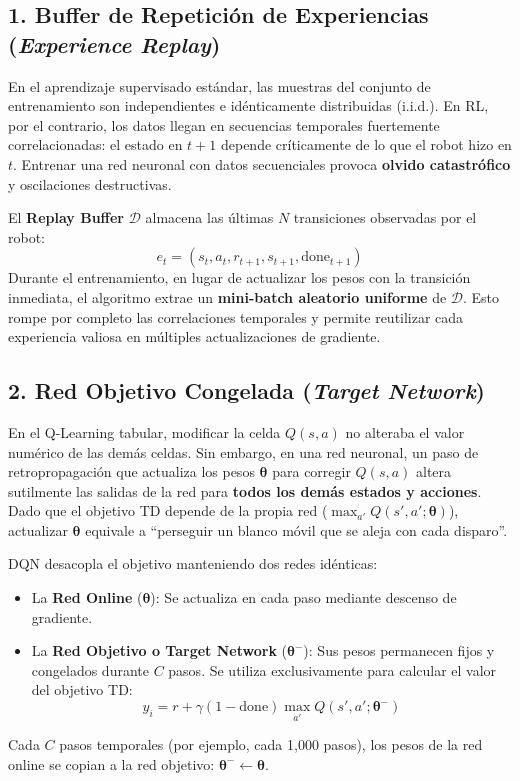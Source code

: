 \subsection{1. Buffer de Repetición de Experiencias (\textit{Experience Replay})}
En el aprendizaje supervisado estándar, las muestras del conjunto de entrenamiento son independientes e idénticamente distribuidas (i.i.d.). En RL, por el contrario, los datos llegan en secuencias temporales fuertemente correlacionadas: el estado en $t+1$ depende críticamente de lo que el robot hizo en $t$. Entrenar una red neuronal con datos secuenciales provoca \textbf{olvido catastrófico} y oscilaciones destructivas.

El \textbf{Replay Buffer} $\mathcal{D}$ almacena las últimas $N$ transiciones observadas por el robot:
\[
  e_t = (s_t, a_t, r_{t+1}, s_{t+1}, \text{done}_{t+1})
\]
Durante el entrenamiento, en lugar de actualizar los pesos con la transición inmediata, el algoritmo extrae un \textbf{mini-batch aleatorio uniforme} de $\mathcal{D}$. Esto rompe por completo las correlaciones temporales y permite reutilizar cada experiencia valiosa en múltiples actualizaciones de gradiente.

\subsection{2. Red Objetivo Congelada (\textit{Target Network})}
En el Q-Learning tabular, modificar la celda $Q(s,a)$ no alteraba el valor numérico de las demás celdas. Sin embargo, en una red neuronal, un paso de retropropagación que actualiza los pesos $\boldsymbol{\theta}$ para corregir $Q(s, a)$ altera sutilmente las salidas de la red para \textbf{todos los demás estados y acciones}. Dado que el objetivo TD depende de la propia red ($\max_{a'} Q(s', a'; \boldsymbol{\theta})$), actualizar $\boldsymbol{\theta}$ equivale a ``perseguir un blanco móvil que se aleja con cada disparo''.

DQN desacopla el objetivo manteniendo dos redes idénticas:
\begin{itemize}
  \item La \textbf{Red Online} ($\boldsymbol{\theta}$): Se actualiza en cada paso mediante descenso de gradiente.
  \item La \textbf{Red Objetivo o Target Network} ($\boldsymbol{\theta}^-$): Sus pesos permanecen fijos y congelados durante $C$ pasos. Se utiliza exclusivamente para calcular el valor del objetivo TD:
  \begin{equation}
    y_i = r + \gamma (1 - \text{done}) \max_{a'} Q(s', a'; \boldsymbol{\theta}^-)
  \end{equation}
\end{itemize}
Cada $C$ pasos temporales (por ejemplo, cada 1,000 pasos), los pesos de la red online se copian a la red objetivo: $\boldsymbol{\theta}^- \leftarrow \boldsymbol{\theta}$.


